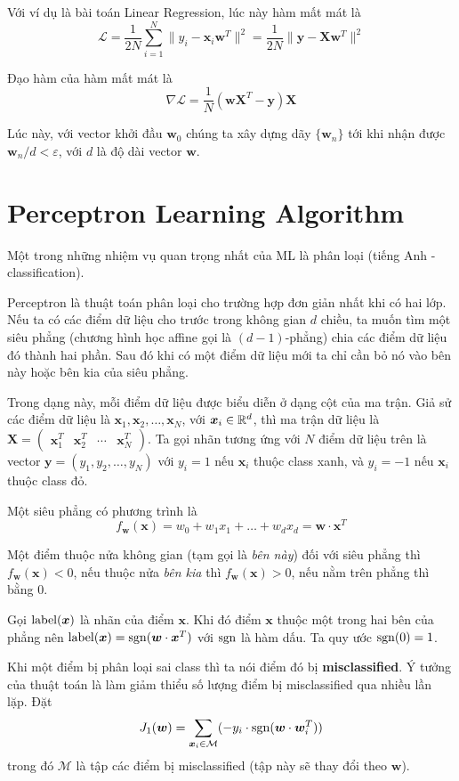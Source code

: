 Với ví dụ là bài toán Linear Regression, lúc này hàm mất mát là \[\mathcal{L} = \dfrac{1}{2N} \sum_{i=1}^N \lVert y_i - \bm{x}_i \bm{w}^T \rVert^2 = \dfrac{1}{2N} \lVert \bm{y} - \bm{X} \bm{w}^T \rVert^2\]

Đạo hàm của hàm mất mát là \[\nabla \mathcal{L} = \dfrac{1}{N} (\bm{w} \bm{X}^T - \bm{y}) \bm{X}\]

Lúc này, với vector khởi đầu $\bm{w}_0$ chúng ta xây dựng dãy $\{ \bm{w}_n \}$ tới khi nhận được $\bm{w}_n / d < \varepsilon$, với $d$ là độ dài vector $\bm{w}$.

\section*{Perceptron Learning Algorithm}

Một trong những nhiệm vụ quan trọng nhất của ML là phân loại (tiếng Anh - classification).

Perceptron là thuật toán phân loại cho trường hợp đơn giản nhất khi có hai lớp. Nếu ta có các điểm dữ liệu cho trước trong không gian $d$ chiều, ta muốn tìm một siêu phẳng (chương hình học affine gọi là $(d-1)$-phẳng) chia các điểm dữ liệu đó thành hai phần. Sau đó khi có một điểm dữ liệu mới ta chỉ cần bỏ nó vào bên này hoặc bên kia của siêu phẳng.

Trong dạng này, mỗi điểm dữ liệu được biểu diễn ở dạng cột của ma trận. Giả sử các điểm dữ liệu là $\bm{x}_1, \bm{x}_2, \ldots, \bm{x}_N$, với $\bm{x}_i \in \mathbb{R}^d$, thì ma trận dữ liệu là $\bm{X} = \begin{pmatrix}
    \bm{x}_1^T & \bm{x}_2^T & \cdots & \bm{x}_N^T
\end{pmatrix}$. Ta gọi nhãn tương ứng với $N$ điểm dữ liệu trên là vector $\bm{y} = (y_1, y_2, \ldots, y_N)$ với $y_i = 1$ nếu $\bm{x}_i$ thuộc class xanh, và $y_i = -1$ nếu $\bm{x}_i$ thuộc class đỏ.

Một siêu phẳng có phương trình là \[ f_{\bm{w}} (\bm{x}) = w_0 + w_1 x_1 + \ldots + w_d x_d = \bm{w} \cdot \bm{x}^T\]

Một điểm thuộc nửa không gian (tạm gọi là \textit{bên này}) đối với siêu phẳng thì $f_{\bm{w}} (\bm{x}) < 0$, nếu thuộc nửa \textit{bên kia} thì $f_{\bm{w}} (\bm{x}) > 0$, nếu nằm trên phẳng thì bằng 0.

Gọi $\operatorname{label} (\bm{x})$ là nhãn của điểm $\bm{x}$. Khi đó điểm $\bm{x}$ thuộc một trong hai bên của phẳng nên $\operatorname{label} (\bm{x}) = \operatorname{sgn}(\bm{w} \cdot \bm{x}^T)$ với $\operatorname{sgn}$ là hàm dấu. Ta quy ước $\operatorname{sgn}(0) = 1$.

Khi một điểm bị phân loại sai class thì ta nói điểm đó bị \textbf{misclassified}. Ý tưởng của thuật toán là làm giảm thiểu số lượng điểm bị misclassified qua nhiều lần lặp. Đặt \[ J_1 (\bm{w}) = \sum_{\bm{x}_i \in \mathcal{M}} (-y_i \cdot \operatorname{sgn} (\bm{w} \cdot \bm{w}_i^T)) \] trong đó $\mathcal{M}$ là tập các điểm bị misclassified (tập này sẽ thay đổi theo $\bm{w}$).

